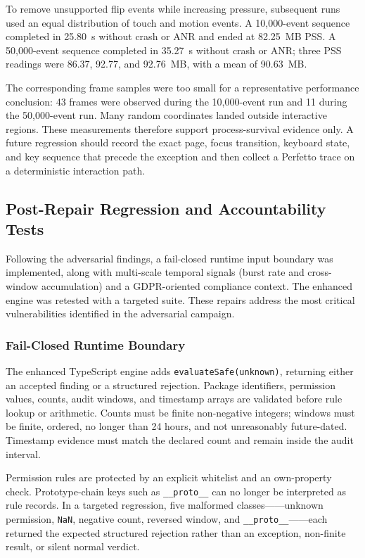 To remove unsupported flip events while increasing pressure, subsequent runs used an equal distribution of touch and motion events. A 10,000-event sequence completed in 25.80~s without crash or ANR and ended at 82.25~MB PSS. A 50,000-event sequence completed in 35.27~s without crash or ANR; three PSS readings were 86.37, 92.77, and 92.76~MB, with a mean of 90.63~MB.

The corresponding frame samples were too small for a representative performance conclusion: 43 frames were observed during the 10,000-event run and 11 during the 50,000-event run. Many random coordinates landed outside interactive regions. These measurements therefore support process-survival evidence only. A future regression should record the exact page, focus transition, keyboard state, and key sequence that precede the exception and then collect a Perfetto trace on a deterministic interaction path.

\subsection{Post-Repair Regression and Accountability Tests}

Following the adversarial findings, a fail-closed runtime input boundary was implemented, along with multi-scale temporal signals (burst rate and cross-window accumulation) and a GDPR-oriented compliance context. The enhanced engine was retested with a targeted suite. These repairs address the most critical vulnerabilities identified in the adversarial campaign.

\subsubsection{Fail-Closed Runtime Boundary}

The enhanced TypeScript engine adds \texttt{evaluateSafe(unknown)}, returning either an accepted finding or a structured rejection. Package identifiers, permission values, counts, audit windows, and timestamp arrays are validated before rule lookup or arithmetic. Counts must be finite non-negative integers; windows must be finite, ordered, no longer than 24 hours, and not unreasonably future-dated. Timestamp evidence must match the declared count and remain inside the audit interval.

Permission rules are protected by an explicit whitelist and an own-property check. Prototype-chain keys such as \texttt{\_\_proto\_\_} can no longer be interpreted as rule records. In a targeted regression, five malformed classes——unknown permission, \texttt{NaN}, negative count, reversed window, and \texttt{\_\_proto\_\_}——each returned the expected structured rejection rather than an exception, non-finite result, or silent normal verdict.

